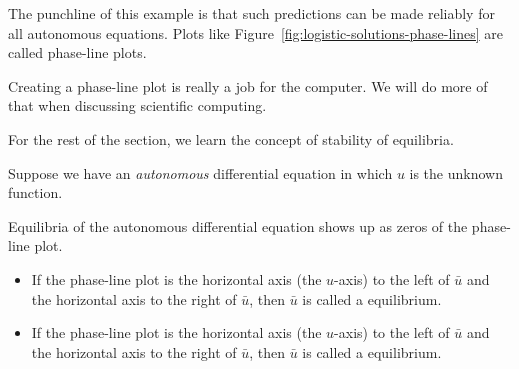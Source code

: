 \documentclass[../main.tex]{subfiles}
\begin{document}
The punchline of this example is that such predictions can be made reliably for all autonomous equations.  Plots like Figure~\ref{fig:logistic-solutions-phase-lines} are called phase-line plots.

\clearpage

Creating a phase-line plot is really a job for the computer. We will do more of that when discussing scientific computing.

For the rest of the section, we learn the concept of stability of equilibria.

\begin{definition}
  Suppose we have an \emph{autonomous} differential equation in which \(u\) is the unknown function. 

  Equilibria of the autonomous differential equation shows up as zeros of the phase-line plot.

  \begin{itemize}
    \item If the phase-line plot is  the horizontal axis (the \(u\)-axis) to the left of \(\bar{u}\) and  the horizontal axis to the right of \(\bar{u}\), then \(\bar{u}\) is called a  equilibrium.
    \item If the phase-line plot is  the horizontal axis (the \(u\)-axis) to the left of \(\bar{u}\) and  the horizontal axis to the right of \(\bar{u}\), then \(\bar{u}\) is called a  equilibrium.
  \end{itemize}
\end{definition}


%
%
\end{document}
